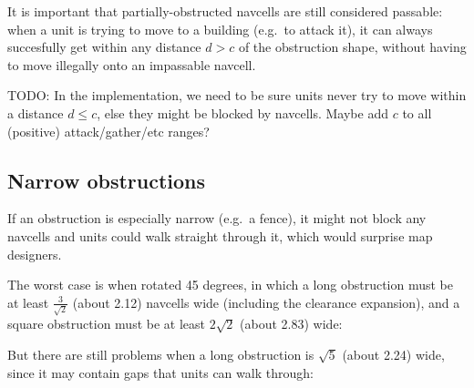 \documentclass[a4paper,10pt]{article}
\begin{document}
It is important that partially-obstructed navcells are still considered passable:
when a unit is trying to move to a building (e.g.\ to attack it),
it can always succesfully get within any distance $d > c$ of the obstruction shape,
without having to move illegally onto an impassable navcell.

TODO: In the implementation, we need to be sure units never try to move
within a distance $d \leq c$, else they might be blocked by navcells.
Maybe add $c$ to all (positive) attack/gather/etc ranges?

\subsection{Narrow obstructions}

If an obstruction is especially narrow (e.g.\ a fence),
it might not block any navcells and units could walk straight through it,
which would surprise map designers.

The worst case is when rotated 45 degrees,
in which a long obstruction
must be at least $\frac{3}{\sqrt{2}}$ (about 2.12) navcells wide
(including the clearance expansion),
and a square obstruction must be at least $2\sqrt{2}$ (about 2.83) wide:


But there are still problems when a long obstruction is $\sqrt{5}$ (about 2.24) wide,
since it may contain gaps that units can walk through:
\end{document}
